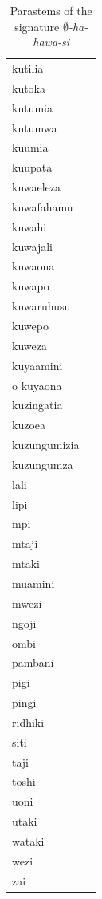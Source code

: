 \documentclass[output=paper,colorlinks,citecolor=brown,
]{langscibook}
\begin{document}
\begin{table}
\begin{footnotesize}
\begin{minipage}{.24\textwidth}
\begin{tabular}{ll}
kutilia \\ 
kutoka \\ 
kutumia\\
kutumwa \\ 
kuumia \\ 
kuupata \\ 
kuwaeleza \\ 
kuwafahamu \\ 
kuwahi \\ 
kuwajali \\ 
kuwaona \\ 
kuwapo \\ 
kuwaruhusu \\ 
kuwepo \\ 
kuweza \\ 
kuyaamini \\ o
kuyaona \\ 
kuzingatia \\ 
kuzoea \\ 
kuzungumizia \\ 
kuzungumza \\\hline
lali \\ 
lipi \\ 
mpi \\ 
mtaji \\ 
mtaki \\ 
muamini \\ 
mwezi \\ 
ngoji \\ 
ombi \\ 
pambani \\ 
pigi \\ 
pingi \\ 
ridhiki \\ 
siti \\ 
taji \\ 
toshi \\ 
uoni \\ 
utaki \\ 
wataki \\ 
wezi \\ 
zai \\ 
\end{tabular}
\end{minipage}
\end{footnotesize}
\caption{Parastems of the signature \textit{$\emptyset$-ha-hawa-si}}
\label{negation2}
\end{table}
\end{document}
